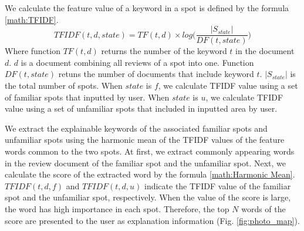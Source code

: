 \documentclass[journal]{IAENGtran}
\begin{document}
We calculate the feature value of a keyword in a spot is defined by the formula \ref{math:TFIDF}.
\begin{equation}
  TFIDF(t,d,state) = TF(t,d) \times log\Biggr(\frac{|S_{state}|}{DF(t,state)}\Biggr)
  \label{math:TFIDF}
\end{equation}
Where function $TF(t,d)$ returns the number of the keyword $t$ in the document $d$.
$d$ is a document combining all reviews of a spot into one.
Function $DF(t,state)$ retuns the number of documents that include keyword $t$.
$|S_{state}|$ is the total number of spots.
When $state$ is $f$, we calculate TFIDF value using a set of familiar spots that inputted by user.
When $state$ is $u$, we calculate TFIDF value using a set of unfamiliar spots that included in inputted area by user.

We extract the explainable keywords of the associated familiar spots and unfamiliar spots using the harmonic mean of the TFIDF values ​​of the feature words common to the two spots.
At first, we extract commonly appearing words in the review document of the familiar spot and the unfamiliar spot.
Next, we calculate the score of the extracted word by the formula \ref{math:Harmonic Mean}.
$TFIDF(t,d,f)$ and $TFIDF(t,d,u)$ indicate the TFIDF value of the familiar spot and the unfamiliar spot, respectively.
When the value of the score is large, the word has high importance in each spot.
Therefore, the top $N$ words of the score are presented to the user as explanation information (Fig. \ref{fig:photo_map}).
\end{document}
